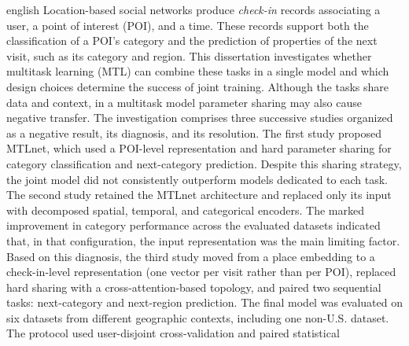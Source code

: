 \begin{resumo}[Abstract]
\begin{otherlanguage*}{english}
            \noindent Location-based social networks produce \emph{check-in} records
            associating a user, a point of interest (POI), and a time. These records
            support both the classification of a POI's category and the prediction of
            properties of the next visit, such as its category and region. This
            dissertation investigates whether multitask learning (MTL) can combine
            these tasks in a single model and which design choices determine the
            success of joint training. Although the tasks share data and context,
            in a multitask model parameter sharing may also cause negative
            transfer. The investigation
            comprises three successive studies organized as a negative result, its
            diagnosis, and its resolution. The first study proposed MTLnet, which used
            a POI-level representation and hard parameter sharing for category
            classification and next-category prediction. Despite this sharing
            strategy, the joint model did not consistently outperform models dedicated
            to each task. The second study
            retained the MTLnet architecture and replaced only its input with
            decomposed spatial, temporal, and categorical encoders. The marked
            improvement in category performance across the evaluated datasets
            indicated that, in that configuration, the input representation was the
            main limiting factor. Based on this diagnosis, the third study moved
            from a place embedding to a check-in-level representation (one vector
            per visit rather than per POI), replaced hard sharing with a
            cross-attention-based topology, and paired two sequential tasks:
            next-category and next-region prediction. The final model was evaluated on
            six datasets from different geographic contexts, including one non-U.S.
            dataset.
            The protocol used user-disjoint cross-validation and paired statistical

\end{otherlanguage*}
\end{resumo}
